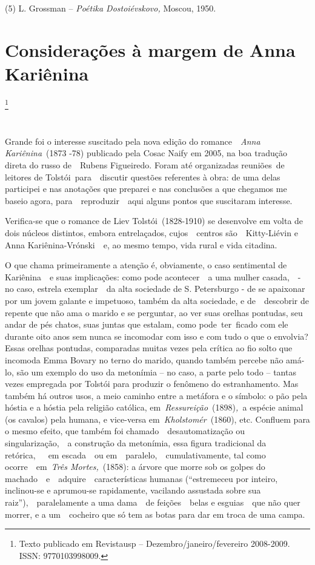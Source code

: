 (5) L. Grossman -- \emph{Poétika Dostoiévskovo,} Moscou, 1950.

\chapter{Considerações à margem de Anna Kariênina}\footnote{Texto
  publicado em Revistausp -- Dezembro/janeiro/fevereiro 2008-2009. ISSN:
  9770103998009.}

~

Grande foi o interesse suscitado pela nova edição do romance~~\emph{Anna
Kariênina}~(1873 -78) publicado pela Cosac Naify em 2005, na boa
tradução direta do russo de~~Rubens Figueiredo. Foram até organizadas
reuniões~de leitores de Tolstói~para~~discutir questões referentes à
obra: de uma delas participei e nas anotações que preparei e nas
conclusões a que chegamos me baseio agora, para~~reproduzir~~aqui alguns
pontos que suscitaram interesse.

Verifica-se que o romance de Liev Tolstói~(1828-1910) se desenvolve em
volta de dois núcleos distintos, embora entrelaçados, cujos~~centros
são~~Kitty-Liévin e Anna Kariênina-Vrónski~~e, ao mesmo tempo, vida
rural e vida citadina.

O que chama primeiramente a atenção é, obviamente, o caso sentimental de
Kariênina~~e suas implicações: como pode acontecer~~a uma mulher
casada,~~- no caso, estrela exemplar~~da alta sociedade de S.
Petersburgo - de se apaixonar por um jovem galante e impetuoso, também
da alta sociedade, e de~~descobrir de repente que não ama o marido e se
perguntar, ao ver suas orelhas pontudas, seu andar de pés chatos, suas
juntas que estalam, como pode~ter~ficado com ele durante oito anos sem
nunca se incomodar com isso e com tudo o que o envolvia? Essas orelhas
pontudas, comparadas muitas vezes pela crítica ao fio solto que incomoda
Emma Bovary no terno do marido, quando também percebe não amá-lo, são um
exemplo do uso da metonímia -- no caso, a parte pelo todo -- tantas
vezes empregada por Tolstói para produzir o fenômeno do estranhamento.
Mas também há outros usos, a meio caminho entre a metáfora e o símbolo:
o pão pela hóstia e a hóstia pela religião católica,
em~\emph{Ressureição}~(1898)\emph{,~}a espécie animal (os cavalos) pela
humana, e vice-versa em~\emph{Kholstomér}~(1860), etc. Confluem para o
mesmo efeito, que também foi chamado~~desautomatização ou
singularização,~~a construção da metonímia, essa figura tradicional da
retórica,~~~em escada~~ou em~~paralelo,~~cumulativamente, tal como
ocorre~~em~\emph{Três Mortes,}~(1858): a árvore que morre sob os golpes
do machado~~e~~adquire~~características humanas (``estremeceu por
inteiro, inclinou-se e aprumou-se rapidamente, vacilando assustada sobre
sua raiz''),~~paralelamente a uma dama~~de feições~~belas e esguias~~que
não quer morrer, e a um~~cocheiro que só tem as botas para dar em troca
de uma campa.

